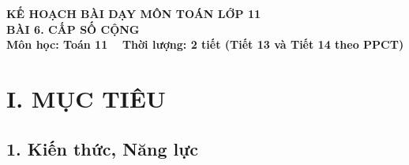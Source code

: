 \documentclass[12pt, a4paper]{article}
\begin{document}
  
  
\begin{center}  
    {\fontsize{14pt}{17pt}\selectfont \textbf{KẾ HOẠCH BÀI DẠY MÔN TOÁN LỚP 11}}\\[6pt]  
    {\fontsize{16pt}{19pt}\selectfont \textbf{BÀI 6. CẤP SỐ CỘNG}}\\[4pt]  
    {\fontsize{12pt}{15pt}\selectfont \textbf{Môn học: Toán 11} \ \textbar \ \textbf{Thời lượng: 2 tiết (Tiết 13 và Tiết 14 theo PPCT)}}  
\end{center}  
  
\vspace{5pt}  
  
\section*{I. MỤC TIÊU}  
  
\subsection*{1. Kiến thức, Năng lực}  
  
\end{document}
